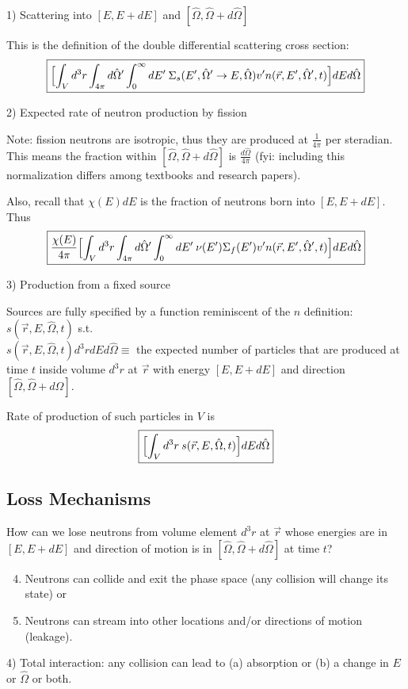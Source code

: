 \documentclass[12pt]{article}
\newcommand{\vOmega}{\ensuremath{\hat{\Omega}}}
\begin{document}
1) Scattering into $[E, E + dE]$ and $[\vOmega, \vOmega + d\vOmega]$

This is the definition of the double differential scattering cross section:
\[\boxed{\Bigl[\int_V d^3r \int_{4\pi} d\vOmega' \int_0^{\infty} dE' \: \Sigma_s(E', \vOmega' \rightarrow E, \vOmega) v' n(\vec{r}, E', \vOmega', t) \Bigr] dE d\vOmega}\]

2) Expected rate of neutron production by fission

Note: fission neutrons are isotropic, thus they are produced at $\frac{1}{4\pi}$ per steradian. This means the fraction within $[\vOmega, \vOmega + d\vOmega]$ is $\frac{d\vOmega}{4\pi}$ (fyi: including this normalization differs among textbooks and research papers).

Also, recall that $\chi(E)dE$ is the fraction of neutrons born into $[E, E + dE]$. Thus
%
\[\boxed{\frac{\chi(E)}{4\pi}\Bigl[\int_V d^3r \int_{4\pi} d\vOmega' \int_0^{\infty} dE' \: \nu(E') \Sigma_f(E') v' n(\vec{r}, E', \vOmega', t) \Bigr] dE d\vOmega}\]

3) Production from a fixed source

Sources are fully specified by a function reminiscent of the $n$ definition: $s(\vec{r}, E, \vOmega, t)$ s.t.\ \\$s(\vec{r}, E, \vOmega, t)d^3rdEd\vOmega \equiv$ the expected number of particles that are produced at time $t$ inside volume $d^3r$ at $\vec{r}$ with energy $[E, E + dE]$ and direction $[\vOmega, \vOmega + d\vOmega]$.

Rate of production of such particles in $V$ is
\[\boxed{\Bigl[\int_V d^3r \:s(\vec{r}, E, \vOmega, t) \Bigr] dE d\vOmega }\]

\subsection*{Loss Mechanisms}
How can we lose neutrons from volume element $d^3r$ at $\vec{r}$ whose energies are in $[E, E + dE]$ and direction of motion is in $[\vOmega, \vOmega + d\vOmega]$ at time $t$?
%
\begin{enumerate}
\setcounter{enumi}{3}
\item Neutrons can collide and exit the phase space (any collision will change its state) or
\item Neutrons can stream into other locations and/or directions of motion (leakage).
\end{enumerate}

4) Total interaction: any collision can lead to (a) absorption or (b) a change in $E$ or $\vOmega$ or both.
\end{document}
